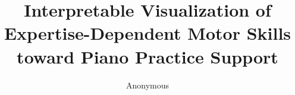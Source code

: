 \documentclass[sigconf,review,anonymous]{acmart}
\begin{document}
\title{Interpretable Visualization of Expertise-Dependent Motor Skills toward Piano Practice Support}

\author{Anonymous}


\renewcommand{\shortauthors}{Anonymous Authors}
\end{document}
